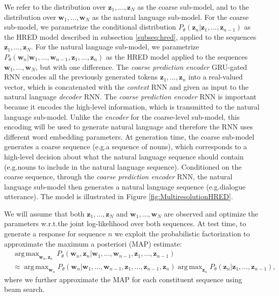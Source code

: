 \documentclass{article}
\DeclareMathOperator*{\argmax}{arg\,max}
\begin{document}
We refer to the distribution over $\mathbf{z}_1, \dots, \mathbf{z}_N$ as the coarse sub-model, and to the distribution over $\mathbf{w}_1, \dots, \mathbf{w}_N$ as the natural language sub-model.
For the coarse sub-model, we parametrize the conditional distribution $P_{\theta}(\mathbf{z}_n | \mathbf{z}_1, \dots, \mathbf{z}_{n-1})$ as the HRED model described in subsection \ref{subseq:hred}, applied to the sequences $\mathbf{z}_1, \dots, \mathbf{z}_{N}$.
For the natural language sub-model, we parametrize $P_{\theta}(\mathbf{w}_n | \mathbf{w}_1, \dots, \mathbf{w}_{n-1}, \mathbf{z}_1, \dots, \mathbf{z}_{n})$ as the HRED model applied to the sequences $\mathbf{w}_1, \dots, \mathbf{w}_N$, but with one difference. The \textit{coarse prediction encoder} GRU-gated RNN encodes all the previously generated tokens $\mathbf{z}_1, \dots, \mathbf{z}_{n}$ into a real-valued vector, which is concatenated with the \textit{context} RNN and given as input to the natural language \textit{decoder} RNN.
The \textit{coarse prediction encoder} RNN is important because it encodes the high-level information, which is transmitted to the natural language sub-model.
Unlike the \textit{encoder} for the coarse-level sub-model, 
this encoding will be used to generate natural language and therefore the RNN uses different word embedding parameters.
At generation time, the coarse sub-model generates a coarse sequence (e.g.\@ a sequence of nouns), which corresponds to a high-level decision about what the natural language sequence should contain (e.g.\@ nouns to include in the natural language sequence).
Conditioned on the coarse sequence, through the \textit{coarse prediction encoder} RNN, 
the natural language sub-model then generates a natural language sequence (e.g.\@ dialogue utterance).
The model is illustrated in Figure \ref{fig:MultiresolutionHRED}.



We will assume that both $\mathbf{z}_1, \dots, \mathbf{z}_N$ and $\mathbf{w}_1, \dots, \mathbf{w}_N$ are observed and optimize the parameters w.r.t.\@ the joint log-likelihood over both sequences. At test time, to generate a response for sequence $n$ we exploit the probabilistic factorization to approximate the maximum a posteriori (MAP) estimate:
\begin{align}
& \argmax_{\mathbf{w}_n, \mathbf{z}_n} \  P_{\theta}(\mathbf{w}_n, \mathbf{z}_n | \mathbf{w}_1, \dots, \mathbf{w}_{n-1}, \mathbf{z}_1, \dots,  \mathbf{z}_{n-1}) \nonumber \\ 
& \approx \argmax_{\mathbf{w}_n} P_{\theta}(\mathbf{w}_n | \mathbf{w}_1, \dots, \mathbf{w}_{n-1}, \mathbf{z}_1, \dots,  \mathbf{z}_{n-1},  \mathbf{z}_n) \argmax_{\mathbf{z}_n} P_{\theta}(\mathbf{z}_n | \mathbf{z}_1, \dots,  \mathbf{z}_{n-1}),
\end{align}
where we further approximate the MAP for each constituent sequence using beam search.  
\end{document}
